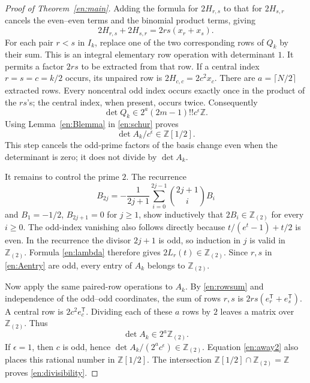 \documentclass[12pt]{amsart}
\theoremstyle{definition}
\theoremstyle{remark}
\numberwithin{equation}{section}
\newcommand{\Z}{\mathbb{Z}}
\newcommand{\Ztwo}{\Z_{(2)}}
\theoremstyle{definition}
\theoremstyle{remark}
\begin{document}
\begin{proof}[Proof of Theorem~\ref{en:main}]
Adding the formula for $2H_{r,s}$ to that for $2H_{s,r}$ cancels
the even--even terms and the binomial product terms, giving
\begin{equation}\label{en:rowsum}
 2H_{r,s}+2H_{s,r}=2rs(x_r+x_s).
\end{equation}
For each pair $r<s$ in $I_k$, replace one of the two corresponding rows
of $Q_k$ by their sum. This is an integral elementary row operation with
determinant $1$. It permits a factor $2rs$ to be extracted from that row.
If a central index $r=s=c=k/2$ occurs, its unpaired row is
$2H_{c,c}=2c^2x_c$. There are $a=\lceil N/2\rceil$ extracted rows.
Every noncentral odd index occurs exactly once in the product of the
$rs$'s; the central index, when present, occurs twice. Consequently
\[
 \det Q_k\in 2^a(2m-1)!!c^\epsilon\Z.
\]
Using Lemma~\ref{en:Blemma} in \eqref{en:schur} proves
\begin{equation}\label{en:away2}
 \det A_k/c^\epsilon\in\Z[1/2].
\end{equation}
This step cancels the odd-prime factors of the basis change even when
the determinant is zero; it does not divide by $\det A_k$.

It remains to control the prime $2$. The recurrence
\[
 B_{2j}=-\frac{1}{2j+1}\sum_{i=0}^{2j-1}
                 \binom{2j+1}{i}B_i
\]
and $B_1=-1/2$, $B_{2j+1}=0$ for $j\geq1$, show inductively that
$2B_i\in\Ztwo$ for every $i\geq0$. The odd-index vanishing also follows
directly because $t/(e^t-1)+t/2$ is even. In the recurrence the divisor
$2j+1$ is odd, so induction in $j$ is valid in $\Ztwo$.
Formula \eqref{en:lambda} therefore gives $2L_r(t)\in\Ztwo$.
Since $r,s$ in \eqref{en:Aentry} are odd, every entry of $A_k$ belongs to
$\Ztwo$.

Now apply the same paired-row operations to $A_k$. By
\eqref{en:rowsum} and independence of the odd--odd coordinates, the sum
of rows $r,s$ is $2rs(e_r^{\mathsf T}+e_s^{\mathsf T})$. A central row is
$2c^2e_c^{\mathsf T}$. Dividing each of these $a$ rows by $2$ leaves
a matrix over $\Ztwo$. Thus
\[
 \det A_k\in2^a\Ztwo.
\]
If $\epsilon=1$, then $c$ is odd, hence
$\det A_k/(2^ac^\epsilon)\in\Ztwo$. Equation \eqref{en:away2} also places
this rational number in $\Z[1/2]$. The intersection
$\Z[1/2]\cap\Ztwo=\Z$ proves \eqref{en:divisibility}.
\end{proof}
\end{document}
